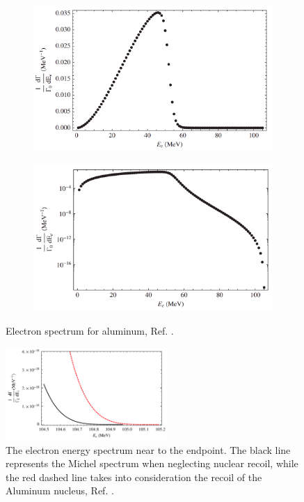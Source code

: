 \begin{figure}[!h]
     \begin{subfigure}[b]{0.4\linewidth}
         \centering
         \includegraphics[scale = 0.18]{figures/png/Screenshot_20240222_175415.png}
         \label{fig:linearscalemichel}
     \end{subfigure}
     \begin{subfigure}[b]{0.7\linewidth}
         \centering
         \includegraphics[scale = 0.18]{figures/png/Screenshot_20240222_175446.png}
         \label{fig:logscalemichel}
     \end{subfigure}
     \caption{Electron spectrum for aluminum, Ref. \cite{PhysRevD.84.013006}.}
        \label{fig:michel}
\end{figure}

\begin{figure}[!h]
\centering
\includegraphics[width =0.55\textwidth]{figures/png/Screenshot_20240222_175644.png}
\caption{The electron energy spectrum near to the endpoint. The black line represents the Michel spectrum when neglecting nuclear recoil, while the red dashed line takes into consideration the recoil of the Aluminum nucleus, Ref. \cite{PhysRevD.84.013006}.}
\label{fig:micheldiff}
\end{figure}
